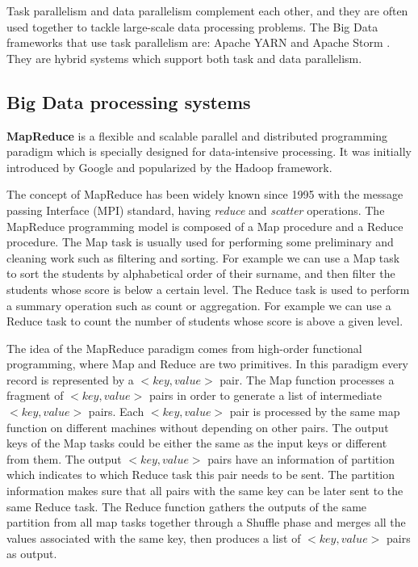 \documentclass[	DIV=calc,%
							paper=a4,%
							fontsize=11pt,%
							twocolumn]{scrartcl}	 					%
\begin{document}
Task parallelism and data parallelism complement each other, and they are often used together to tackle large-scale data processing problems. The Big Data frameworks that use task parallelism are: Apache YARN \cite{3} and Apache Storm \cite{4}. They are hybrid systems which support both task and data parallelism.


\subsection*{Big Data processing systems}

\textbf{MapReduce} is a flexible and scalable parallel and distributed programming paradigm which is specially designed for data-intensive processing. It was initially introduced  by Google \cite{MapReduce} and popularized by the Hadoop framework. 

The concept of MapReduce has been widely known since 1995 with the message passing Interface (MPI) \cite{MPI} standard, having \emph{reduce}  and \emph{scatter} operations. %
 The MapReduce programming model is composed of a Map procedure and a Reduce procedure. The Map task is usually used for performing some preliminary and cleaning work such as filtering and sorting. For example we can use a Map task to sort the students by alphabetical order of their surname, and then filter the students whose score is below a certain level. The Reduce task is used to perform a summary operation such as count or aggregation. For example we can use a Reduce task to count the number of students whose score is above a given level.  

The idea of the MapReduce paradigm comes from high-order functional programming, where Map and Reduce are two primitives. In this paradigm every record is represented by a $<key, value>$ pair. The Map function processes a fragment of $<key, value>$ pairs in order to generate a list of intermediate $<key, value>$ pairs. Each $<key, value>$ pair is processed by the same map function on different machines without depending on other pairs. The output keys of the Map tasks could be either the same as the input keys or different from them. The output $<key, value>$ pairs have an information of partition which indicates to which Reduce task this pair needs to be sent. The partition information makes sure that all pairs with the same key can be later sent to the same Reduce task. The Reduce function gathers the outputs of the same partition from all map tasks together through a Shuffle phase and merges all the values associated with the same key, then produces a list of $<key, value>$ pairs as output. 
\end{document}
